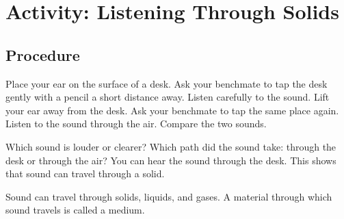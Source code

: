 \section{Activity: Listening Through Solids}
\subsection{Procedure}
Place your ear on the surface of a desk. Ask your benchmate to tap the desk gently with a pencil a short distance away. Listen carefully to the sound. Lift your ear away from the desk. Ask your benchmate to tap the same place again. Listen to the sound through the air. Compare the two sounds.
\begin{marginfigure}
  \caption{Illustration of a child resting their head on a desk with their ear close to the desk}
\end{marginfigure}
 Which sound is louder or clearer? Which path did the sound take: through the desk or through the air?
 You can hear the sound through the desk. This shows that sound can travel through a solid.

Sound can travel through solids, liquids, and gases. A material through which sound travels is called a medium.